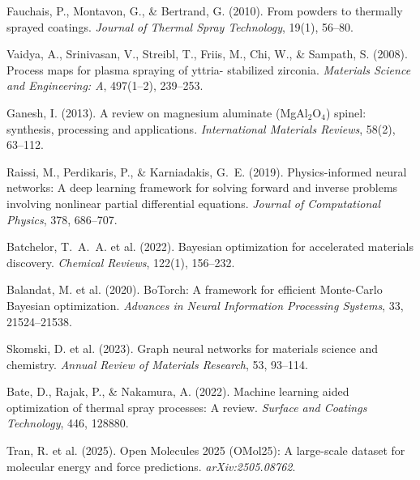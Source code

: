 \documentclass[11pt,letterpaper]{article}
\begin{document}
\begin{enumerate}[nosep,label={[\arabic*]}]
  \item Fauchais, P., Montavon, G., \& Bertrand, G. (2010). From
        powders to thermally sprayed coatings. \textit{Journal of
        Thermal Spray Technology}, 19(1), 56--80.

  \item Vaidya, A., Srinivasan, V., Streibl, T., Friis, M., Chi, W., \&
        Sampath, S. (2008). Process maps for plasma spraying of yttria-
        stabilized zirconia. \textit{Materials Science and Engineering: A},
        497(1--2), 239--253.

  \item Ganesh, I. (2013). A review on magnesium aluminate (MgAl$_2$O$_4$)
        spinel: synthesis, processing and applications. \textit{International
        Materials Reviews}, 58(2), 63--112.

  \item Raissi, M., Perdikaris, P., \& Karniadakis, G.~E. (2019).
        Physics-informed neural networks: A deep learning framework for
        solving forward and inverse problems involving nonlinear partial
        differential equations. \textit{Journal of Computational Physics},
        378, 686--707.

  \item Batchelor, T.~A.~A. et al. (2022). Bayesian optimization for
        accelerated materials discovery. \textit{Chemical Reviews},
        122(1), 156--232.

  \item Balandat, M. et al. (2020). BoTorch: A framework for efficient
        Monte-Carlo Bayesian optimization. \textit{Advances in Neural
        Information Processing Systems}, 33, 21524--21538.

  \item Skomski, D. et al. (2023). Graph neural networks for materials
        science and chemistry. \textit{Annual Review of Materials
        Research}, 53, 93--114.

  \item Bate, D., Rajak, P., \& Nakamura, A. (2022). Machine learning
        aided optimization of thermal spray processes: A review.
        \textit{Surface and Coatings Technology}, 446, 128880.

  \item Tran, R. et al. (2025). Open Molecules 2025 (OMol25): A large-scale
        dataset for molecular energy and force predictions.
        \textit{arXiv:2505.08762}.


\end{enumerate}
\end{document}
